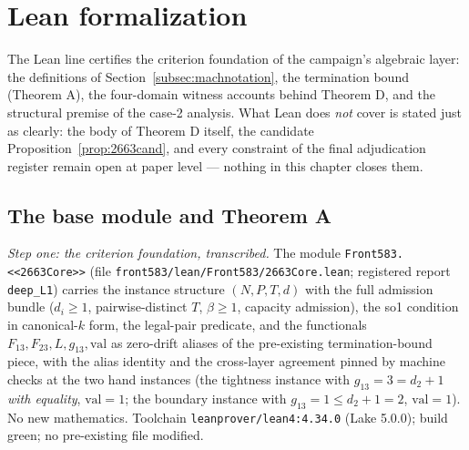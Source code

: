 \section{Lean formalization}\label{sec:lean}

The Lean line certifies the criterion foundation of the campaign's algebraic layer: the
definitions of Section~\ref{subsec:machnotation}, the termination bound (Theorem A), the
four-domain witness accounts behind Theorem D, and the structural premise of the case-2
analysis. What Lean does \emph{not} cover is stated just as clearly: the body of Theorem D
itself, the candidate Proposition~\ref{prop:2663cand}, and every constraint of the final
adjudication register remain open at paper level --- nothing in this chapter closes them.

\subsection{The base module and Theorem A}\label{subsec:leanbase}

{\sloppy \emph{Step one: the criterion foundation, transcribed.} The module
\verb|Front583.<<2663Core>>| (file
\texttt{front583/lean/\allowbreak Front583/\allowbreak 2663Core.lean}; registered report
\texttt{deep\_L1}) carries the instance structure $(N,P,T,d)$ with the full admission
bundle ($d_i\ge1$, pairwise-distinct $T$, $\beta\ge1$, capacity admission), the so1
condition in canonical-$k$ form, the legal-pair predicate, and the functionals
$F_{13},F_{23},L,g_{13},\mathrm{val}$ as zero-drift aliases of the pre-existing
termination-bound piece, with the alias identity and the cross-layer agreement pinned by
machine checks at the two hand instances (the tightness instance with $g_{13}=3=d_2+1$
\emph{with equality}, $\mathrm{val}=1$; the boundary instance with $g_{13}=1\le d_2+1=2$,
$\mathrm{val}=1$). No new mathematics. Toolchain \texttt{leanprover/lean4:4.34.0} (Lake
5.0.0); build green; no pre-existing file modified.\par}


